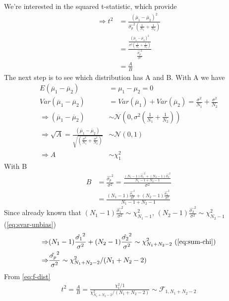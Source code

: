 We're interested in the squared t-statistic, which provide
\begin{align*}
	\Rightarrow t^2 & = \frac	{(\overline \mu_1 - \overline \mu_2)^2}
								{\hat{\sigma_p}^2 \left( \frac{1}{N_1} + \frac{1}{N_2}\right) } \\
					& = \frac	{ \frac	{(\overline \mu_1 - \overline \mu_2)^2}
										{\sigma^2 \left( \frac{1}{N_1} + \frac{1}{N_2}\right)} }
								{ \frac {\hat{\sigma_p}^2}
								 		{\sigma^2} } \\
					& = \frac{A}{B}
\end{align*}
The next step is to see which distribution has A and B. With A we have 
\begin{align*}
	E(\overline \mu_1 - \overline \mu_2) &= \mu_1 - \mu_2 = 0 \\
	Var(\overline \mu_1 - \overline \mu_2) &= Var(\overline \mu_1) + Var(\overline \mu_2) = \frac{\sigma^2}{N_1} + \frac{\sigma^2}{N_2}\\
	\Rightarrow (\overline \mu_1 - \overline \mu_2) 
				&\sim \mathcal {N}(0, \sigma^2(\frac{1}{N_1} + \frac{1}{N_2}))\\
	\Rightarrow \sqrt{A} = \frac{(\overline \mu_1 - \overline \mu_2)}
								{\sqrt{(\frac{\sigma^2}{N_1} + \frac{\sigma^2}{N_2})}}
				&\sim \mathcal {N}(0, 1)\\
	\Rightarrow A &\sim \mathcal \chi^2_1
\end{align*}
With B
\begin{align*}
	B &= \frac 	{\hat{\sigma_p}^2}{\sigma^2} = 
	     \frac	{ \frac	{(N_1 - 1)\hat{\sigma_1}^2 + (N_2 - 1)\hat{\sigma_2}^2}
						{N_1 - 1 + N_2 - 1} }
				{\sigma^2} \\
	  &= \frac	{ (N_1-1)\frac{\hat{\sigma_1}^2}{\sigma^2} + (N_2-1)\frac{\hat{\sigma_2}^2}{\sigma^2} }{N_1-1+N_2-1}
\end{align*}
Since already known that $(N_1-1)\frac{\hat{\sigma_1}^2}{\sigma^2} \sim \chi^2_{N_1-1}$, $(N_2-1)\frac{\hat{\sigma_2}^2}{\sigma^2} \sim \chi^2_{N_2-1}$	(\autoref{eq:svar-unbias})
\begin{align*}
	\Rightarrow &(N_1-1)\frac{\hat{\sigma_1}^2}{\sigma^2} + (N_2-1)\frac{\hat{\sigma_2}^2}{\sigma^2} \sim \chi^2_{N_1+N_2-2} \text{ (\autoref{eq:sum-chi})} \\
	\Rightarrow &\frac{\hat{\sigma_p}^2}{\sigma^2} \sim \chi^2_{N_1+N_2-2}/(N_1+N_2-2)
\end{align*}
From \autoref{eq:f-dist}
\begin{align*}
	t^2 = \frac{A}{B} = \frac{\chi^2_1 / 1}{\chi^2_{N_1+N_2-2} / (N_1+N_2-2)} \sim \mathcal {F}_{1, N_1+N_2-2}
\end{align*}
